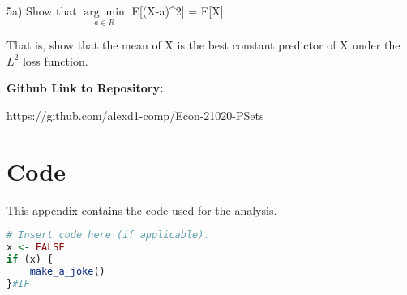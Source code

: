 5a) Show that $\underset{a \in{R}}{\arg\min}$ E[(X-a)^2] = E[X]. 

That is, show that the mean of X is the best constant predictor of X under the $L^2$ loss function.



\newpage
\textbf{Github Link to Repository:}

https://github.com/alexd1-comp/Econ-21020-PSets

\newpage
\appendix

\section{Code}

This appendix contains the code used for the analysis. 

\begin{lstlisting}[language=R, basicstyle=\footnotesize\ttfamily]
# Insert code here (if applicable).
x <- FALSE
if (x) {
    make_a_joke()
}#IF
\end{lstlisting}



